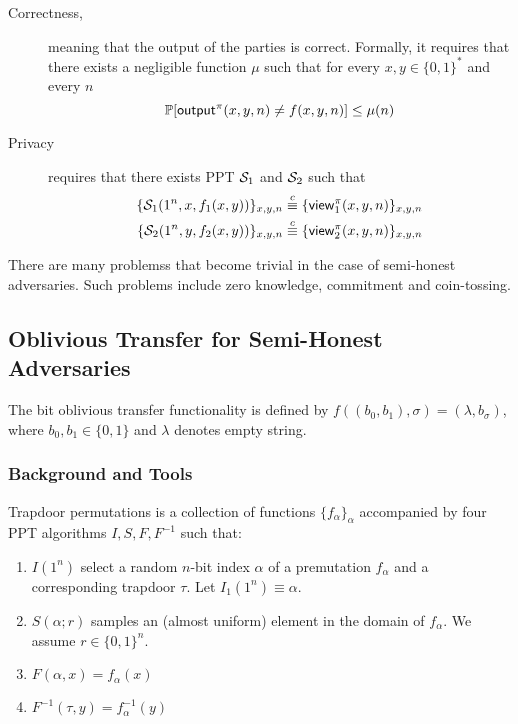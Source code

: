 \begin{description}
\item[Correctness,] meaning that the output of the parties is correct. Formally, it requires that there exists a negligible function $\mu$ such that for every $x,y\in\{0,1\}^*$ and every $n$
    $$\mathop{\mathbb P\/}[{\sf output}^\pi(x,y,n)\neq f(x,y,n)]\leq\mu(n)$$
\item[Privacy] requires that there exists PPT $\mathcal{S}_1$ and $\mathcal{S}_2$ such that
\begin{align*}
    \{\mathcal{S}_1(1^n,x,f_1(x,y))\}_{x,y,n} \stackrel{c}{\equiv} \{{\sf view}^\pi_1(x,y,n)\}_{x,y,n} \\
    \{\mathcal{S}_2(1^n,y,f_2(x,y))\}_{x,y,n} \stackrel{c}{\equiv} \{{\sf view}^\pi_2(x,y,n)\}_{x,y,n} \\
\end{align*}
\end{description}
\begin{remark} There are many problemss that become trivial in the case of semi-honest adversaries. Such problems include zero knowledge, commitment and coin-tossing.
\end{remark}
\subsection{Oblivious Transfer for Semi-Honest Adversaries}
The bit oblivious transfer functionality is defined by $f((b_0,b_1), \sigma )=(\lambda,b_\sigma)$, where $b_0,b_1\in\{0,1\}$ and $\lambda$ denotes empty string.
\subsubsection{Background and Tools}
\begin{definition}
Trapdoor permutations is a collection of functions $\{f_\alpha\}_\alpha$ accompanied by four PPT algorithms $I,S,F,F^{-1}$ such that:
\begin{enumerate}
\item $I(1^n)$ select a random $n$-bit index $\alpha$ of a premutation $f_\alpha$ and a corresponding trapdoor $\tau$. Let $I_1(1^n)\equiv\alpha$.
\item $S(\alpha;r)$ samples an (almost uniform) element in the domain of $f_\alpha$. We assume $r\in\{0,1\}^n$.
\item $F(\alpha,x)=f_\alpha(x)$
\item $F^{-1}(\tau,y)=f^{-1}_\alpha(y)$
\end{enumerate}
\end{definition}

